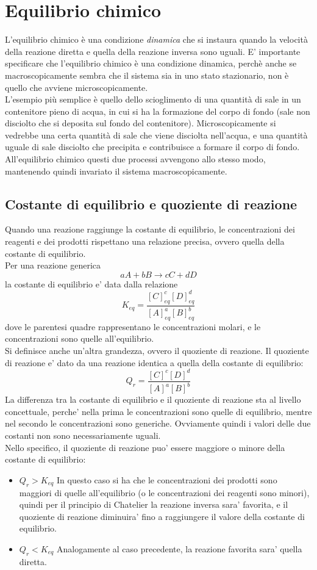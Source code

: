 \documentclass[12pt]{article}
\begin{document}
\section{Equilibrio chimico}
L'equilibrio chimico è una condizione \textit{dinamica} che si instaura quando la velocità della reazione diretta e quella della reazione inversa sono uguali. E' importante specificare che l'equilibrio
chimico è una condizione dinamica, perchè anche se macroscopicamente sembra che il sistema sia in uno stato stazionario, non è quello che avviene microscopicamente. \\
L'esempio più semplice è quello dello scioglimento di una quantità di sale in un contenitore pieno di acqua, in cui si ha la formazione del corpo di fondo (sale non disciolto che si deposita sul 
fondo del contenitore). Microscopicamente si vedrebbe una certa quantità di sale che viene disciolta nell'acqua, e una quantità uguale di sale disciolto che precipita e contribuisce a formare il corpo 
di fondo. All'equilibrio chimico questi due processi avvengono allo stesso modo, mantenendo quindi invariato il sistema macroscopicamente.
\subsection{Costante di equilibrio e quoziente di reazione} 
Quando una reazione raggiunge la costante di equilibrio, le concentrazioni dei reagenti e dei prodotti rispettano una relazione precisa, ovvero quella della costante di equilibrio. \\
Per una reazione generica
$$
	aA + bB \rightarrow cC + dD
$$
la costante di equilibrio e' data dalla relazione
$$
	K_{eq} = \frac{[C]_{eq}^c[D]_{eq}^d}{[A]_{eq}^a[B]_{eq}^b}
$$
dove le parentesi quadre rappresentano le concentrazioni molari, e le concentrazioni sono quelle all'equilibrio. \\
Si definisce anche un'altra grandezza, ovvero il quoziente di reazione. Il quoziente di reazione e' dato da una reazione identica a quella della costante di equilibrio:
$$
	Q_r = \frac{[C]^c[D]^d}{[A]^a[B]^b}
$$
La differenza tra la costante di equilibrio e il quoziente di reazione sta al livello concettuale, perche' nella prima le concentrazioni sono quelle di equilibrio, mentre nel secondo le concentrazioni sono generiche. Ovviamente quindi i valori delle due costanti non sono necessariamente uguali. \\
Nello specifico, il quoziente di reazione puo' essere maggiore o minore della costante di equilibrio:
\begin{itemize}
	\item $Q_r > K_{eq}$ In questo caso si ha che le concentrazioni dei prodotti sono maggiori di quelle all'equilibrio (o le concentrazioni dei reagenti sono minori), quindi per il principio di Chatelier la reazione inversa sara' favorita, e il quoziente di reazione diminuira' fino a raggiungere il valore della costante di equilibrio. \\
	\item $Q_r < K_{eq}$ Analogamente al caso precedente, la reazione favorita sara' quella diretta.
\end{itemize}
\end{document}
